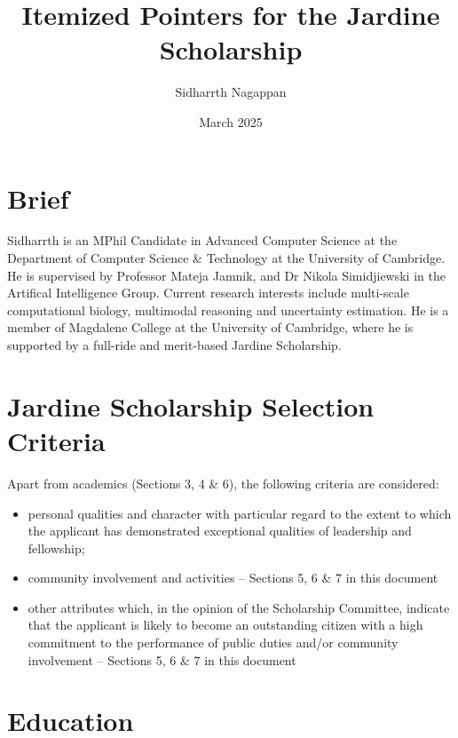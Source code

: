 \documentclass{article}
\title{Itemized Pointers for the Jardine Scholarship}
\author{Sidharrth Nagappan}
\date{March 2025}
\begin{document}
\maketitle

\section{Brief}

Sidharrth is an MPhil Candidate in Advanced Computer Science at the Department of Computer Science \& Technology at the University of Cambridge. He is supervised by Professor Mateja Jamnik, and Dr Nikola Simidjiewski in the Artifical Intelligence Group. Current research interests include multi-scale computational biology, multimodal reasoning and uncertainty estimation. He is a member of Magdalene College at the University of Cambridge, where he is supported by a full-ride and merit-based Jardine Scholarship. 


\section{Jardine Scholarship Selection Criteria}

Apart from academics (Sections 3, 4 \& 6), the following criteria are considered:
\begin{itemize}
    \item personal qualities and character with particular regard to the extent to
    which the applicant has demonstrated exceptional qualities of leadership
    and fellowship;
    \item community involvement and activities -- Sections 5, 6 \& 7 in this document
    \item other attributes which, in the opinion of the Scholarship Committee,
    indicate that the applicant is likely to become an outstanding citizen with
    a high commitment to the performance of public duties and/or community
    involvement -- Sections 5, 6 \& 7 in this document
\end{itemize}


\section{Education}
\end{document}
